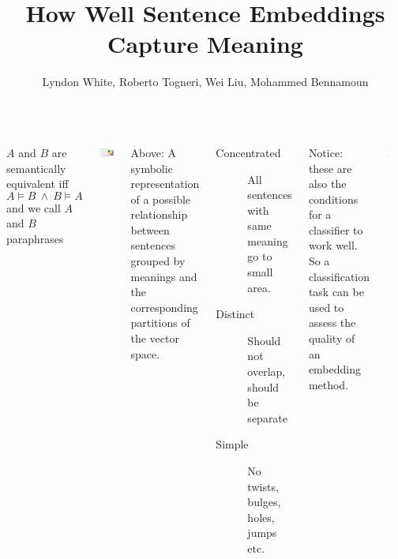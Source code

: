 \documentclass[a0paper, landscape]{tikzposter}
\title{How Well Sentence Embeddings Capture Meaning}
\author{Lyndon White, Roberto Togneri, Wei Liu, Mohammed Bennamoun}
\institute{Contact: lyndon.white@research.uwa.edu.au}
\date{}
\begin{document}
\maketitle

\begin{columns}
    
    {
		{
 			$A$ and $B$ are semantically equivalent iff $$A\models B\:\wedge\:B\models A$$
 			and we call $A$ and $B$ paraphrases
 		}
 		\vspace{1.5ex}
		\begin{tikzfigure}
			\includegraphics[scale=2]{equiv}							
		\end{tikzfigure}
		{\small Above: A symbolic representation of a possible relationship between sentences grouped by meanings and the corresponding partitions of the vector space.}
		
		\vspace{2ex}
       	{
       		\begin{description}%
       			\item[Concentrated]\quad All sentences with same meaning go to small area.
       			\item[Distinct]\quad Should not overlap, should be separate      			
       			\item[Simple]\quad No twists, bulges, holes, jumps etc.      			
       		\end{description}
       		
			Notice: these are also the conditions for a classifier to work well.\\
			So a classification task can be used to assess the quality of an embedding method.
       	}
       	\vspace{2ex}
 	    {	
   	 		\begin{tikzfigure}
		     	\includegraphics[width=0.29\textwidth]{block_overview_poster}
   	 		\end{tikzfigure}
 	    }
 	}


\end{columns}
\end{document}
